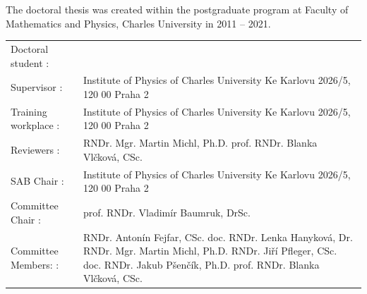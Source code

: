 \openright
\hypersetup{pageanchor=true}
\pagestyle{plain}


\noindent
The doctoral thesis was created within the postgraduate program at Faculty of
Mathematics and Physics, Charles University in 2011 -- 2021.

\vspace{10mm}
{%
\setlength{\defaultaddspace}{3mm}%
\noindent%
\begin{tabularx}{\textwidth}{@{}l<{:}X@{}}
Doctoral student
	& \ThesisAuthor \\
\addlinespace

Supervisor
	& \Supervisor \newline
	  Institute of Physics of Charles University \newline
		Ke Karlovu 2026/5, 120 00 Praha 2 \\
\addlinespace

Training workplace
	& Institute of Physics of Charles University \newline
		Ke Karlovu 2026/5, 120 00 Praha 2 \\
\addlinespace

Reviewers
	& RNDr. Mgr. Martin Michl, Ph.D. \newline
	  prof. RNDr. Blanka Vlčková, CSc. \\
\addlinespace

SAB Chair
	& \Supervisor \newline
	  Institute of Physics of Charles University \newline
		Ke Karlovu 2026/5, 120 00 Praha 2 \\
\addlinespace

Committee Chair
	& prof. RNDr. Vladimír Baumruk, DrSc. \\
\addlinespace

Committee Members:
	& RNDr. Antonín Fejfar, CSc. \newline
	  doc. RNDr. Lenka Hanyková, Dr. \newline
	  RNDr. Mgr. Martin Michl, Ph.D. \newline
	  RNDr. Jiří Pfleger, CSc. \newline
	  doc. RNDr. Jakub Pšenčík, Ph.D. \newline
	  prof. RNDr. Blanka Vlčková, CSc. \\

\end{tabularx}
}
\vspace{10mm}

